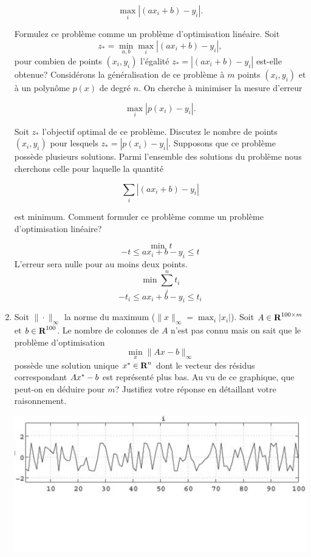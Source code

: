 \begin{enumerate}
    $$\max_i | (ax_i+b)-y_i |.$$

    Formulez ce problème comme un problème d'optimisation linéaire. Soit
    $$z_* = \min_{a, b} \max_i|(ax_i+b)-y_i|,$$ pour combien de points
    $(x_i, y_i)$ l'égalité
    $z_*= | (ax_i+b)-y_i |$ est-elle obtenue? Considérons la généralisation de ce problème à $m$ points $(x_i, y_i)$ et à un polynôme $p(x)$ de degré $n$. On
    cherche à minimiser la mesure d'erreur

    $$\max_i | p(x_i)-y_i |.$$

    Soit $z_*$ l'objectif optimal de ce problème. Discutez le nombre de points $(x_i, y_i)$ pour lesquels $z_*= | p(x_i)-y_i|$. Supposons que ce problème
    possède plusieurs solutions. Parmi l'ensemble des solutions du problème nous cherchons celle pour laquelle la quantité

    $$\sum_i | (ax_i+b)-y_i |$$

    est minimum. Comment formuler ce problème comme un problème d'optimisation linéaire?




    \begin{solution}
      $$\min ~t$$
      $$ -t \le ax_{i} + b - y_{i} \le t $$
      L'erreur sera nulle pour au moins deux points. \\
      $$\min \sum_{i}^{n} t_{i}$$
      $$-t_{i} \le ax_{i} + b - y_{i} \le t_{i}$$
    \end{solution}

  \item  Soit $\| \cdot \|_{\infty}$ la norme du maximum ($\| x \|_{\infty}=\max_i |x_i|$).
    Soit $A \in {\mbox{\bf R}}^{100 \times m}$  et
    $b
    \in
    {\mbox{\bf R}}^{100}$. Le nombre de colonnes de $A$ n'est pas connu mais on sait que le problème
    d'optimisation
    $$\min_{x} \|Ax-b\|_{\infty}$$
    possède une solution unique  $x^* \in {\mbox{\bf R}}^n$ dont  le
    vecteur des résidus correspondant $Ax^*-b$ est représenté plus bas. Au vu de ce graphique, que peut-on en
    déduire pour
    $m$? Justifiez votre réponse en détaillant votre raisonnement.

    \begin{center}
      \includegraphics[scale=0.3]{residus.jpg}
    \end{center}


\end{enumerate}
